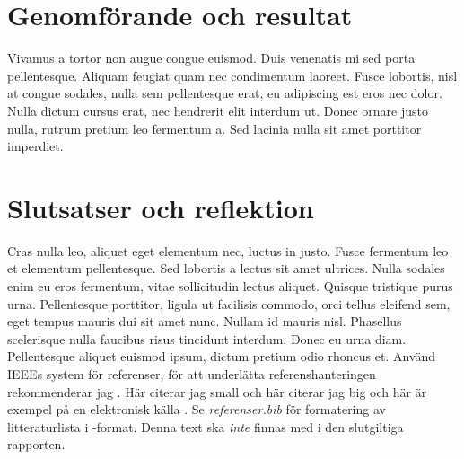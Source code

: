 \documentclass[a4paper,11pt]{report} %
\begin{document}
\section{Genomförande och resultat}
Vivamus a tortor non augue congue euismod. Duis venenatis mi sed porta pellentesque. Aliquam feugiat quam nec condimentum laoreet. Fusce lobortis, nisl at congue sodales, nulla sem pellentesque erat, eu adipiscing est eros nec dolor. Nulla dictum cursus erat, nec hendrerit elit interdum ut. Donec ornare justo nulla, rutrum pretium leo fermentum a. Sed lacinia nulla sit amet porttitor imperdiet.
\section{Slutsatser och reflektion}
Cras nulla leo, aliquet eget elementum nec, luctus in justo. Fusce fermentum leo et elementum pellentesque. Sed lobortis a lectus sit amet ultrices. Nulla sodales enim eu eros fermentum, vitae sollicitudin lectus aliquet. Quisque tristique purus urna. Pellentesque porttitor, ligula ut facilisis commodo, orci tellus eleifend sem, eget tempus mauris dui sit amet nunc. Nullam id mauris nisl. Phasellus scelerisque nulla faucibus risus tincidunt interdum. Donec eu urna diam. Pellentesque aliquet euismod ipsum, dictum pretium odio rhoncus et.
\newpage
Använd IEEEs system för referenser, för att underlätta referenshanteringen rekommenderar jag \BibTeX. Här citerar jag small \cite{small} och här citerar jag big \cite{big} och här är exempel på en elektronisk källa \cite{sven02}. Se \emph{referenser.bib} för formatering av litteraturlista i \BibTeX-format. Denna text ska \emph{inte} finnas med i den slutgiltiga rapporten.


\end{document}
